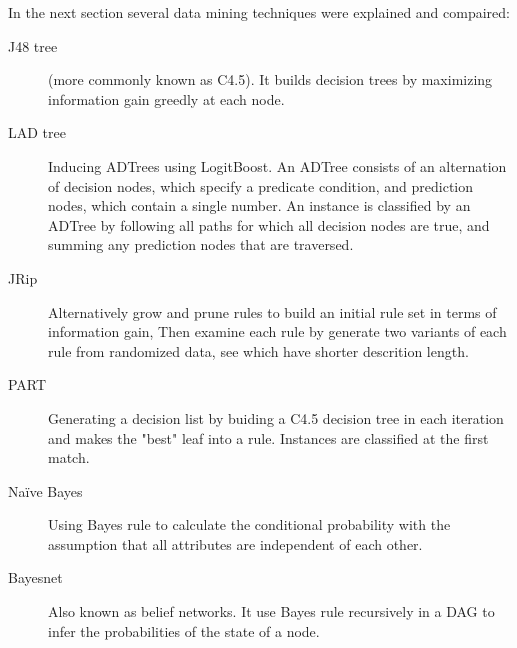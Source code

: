\documentclass{manuscript}
\begin{document}
    In the next section several data mining techniques were explained and compaired:
    \begin{description}
        \item[J48 tree] (more commonly known as C4.5). It builds decision trees by maximizing information gain greedly at
                        each node.\textsuperscript{\cite{quinlan_c4.5:_1993}}
        \item[LAD tree] Inducing ADTrees using LogitBoost. An ADTree consists of an alternation of decision nodes, which
                        specify a predicate condition, and prediction nodes, which contain a single number. An instance
                        is classified by an ADTree by following all paths for which all decision nodes are true, and
                        summing any prediction nodes that are traversed.\textsuperscript{\cite{holmes_multiclass_2002}}
        \item[JRip] Alternatively grow and prune rules to build an initial rule set in terms of information gain, Then
                    examine each rule by generate two variants of each rule from randomized data, see which have shorter
                    descrition length.\textsuperscript{\cite{cohen_fast_1995}}
        \item[PART] Generating a decision list by buiding a C4.5 decision tree in each iteration and makes the "best" leaf
                    into a rule. Instances are classified at the first match.\textsuperscript{\cite{frank_generating_1998}}
        \item[Naïve Bayes] Using Bayes rule to calculate the conditional probability with the assumption that all
                           attributes are independent of each other.\textsuperscript{\cite{john_estimating_1995}}
        \item[Bayesnet] Also known as belief networks. It use Bayes rule recursively in a DAG to infer the probabilities
                        of the state of a node.\textsuperscript{\cite{barco_comparison_2006}}
    \end{description}



    
    
\end{document}
